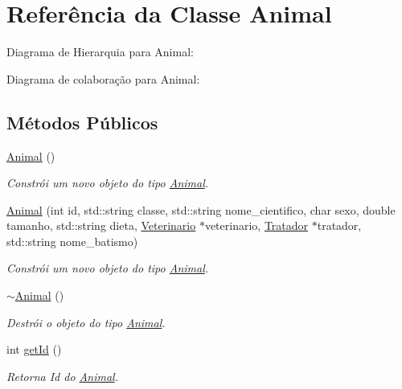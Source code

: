 \hypertarget{classAnimal}{}\section{Referência da Classe Animal}
\label{classAnimal}


Diagrama de Hierarquia para Animal\+:


Diagrama de colaboração para Animal\+:
\subsection*{Métodos Públicos}
\begin{DoxyCompactItemize}
\item 
\mbox{\label{classAnimal_a1e726a49ec952443190ac62dad22353c}} 
\hyperlink{classAnimal_a1e726a49ec952443190ac62dad22353c}{Animal} ()
\begin{DoxyCompactList}\small\item\em Constrói um novo objeto do tipo \hyperlink{classAnimal}{Animal}. \end{DoxyCompactList}\item 
\hyperlink{classAnimal_ab045099aad905de0d8c7fbbab296cad6}{Animal} (int id, std\+::string classe, std\+::string nome\+\_\+cientifico, char sexo, double tamanho, std\+::string dieta, \hyperlink{classVeterinario}{Veterinario} $\ast$veterinario, \hyperlink{classTratador}{Tratador} $\ast$tratador, std\+::string nome\+\_\+batismo)
\begin{DoxyCompactList}\small\item\em Constrói um novo objeto do tipo \hyperlink{classAnimal}{Animal}. \end{DoxyCompactList}\item 
\mbox{\label{classAnimal_a476af25adde5f0dfa688129c8f86fa5c}} 
\hyperlink{classAnimal_a476af25adde5f0dfa688129c8f86fa5c}{$\sim$\+Animal} ()
\begin{DoxyCompactList}\small\item\em Destrói o objeto do tipo \hyperlink{classAnimal}{Animal}. \end{DoxyCompactList}\item 
int \hyperlink{classAnimal_a2c27e56355bc2b40d65250da2bb8a102}{get\+Id} ()
\begin{DoxyCompactList}\small\item\em Retorna Id do \hyperlink{classAnimal}{Animal}. \end{DoxyCompactList}\item 

\end{DoxyCompactItemize}
